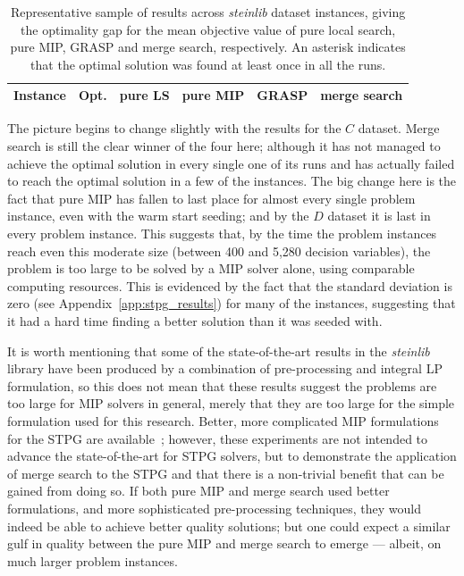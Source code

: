 \documentclass[preprint]{elsarticle}
\begin{document}
\begin{table}[h!]
\centering
\caption{Representative sample of results across \emph{steinlib} dataset instances, giving the optimality gap for the mean objective value of pure local search, pure MIP, GRASP and merge search, respectively. An asterisk indicates that the optimal solution was found at least once in all the runs.}\label{tab:stpg:results:trunc} 
\begin{tabular}{lrrrrr} \toprule
Instance & Opt. & pure LS & pure MIP & GRASP & merge search\\ \midrule
%

%
\bottomrule
\end{tabular}
\end{table}

The picture begins to change slightly with the results for the \(C\) dataset. Merge search is still the clear winner of the four here; although it has not managed to achieve the optimal solution in every single one of its runs and has actually failed to reach the optimal solution in a few of the instances. The big change here is the fact that pure MIP has fallen to last place for almost every single problem instance, even with the warm start seeding; and by the \(D\) dataset it is last in every problem instance. This suggests that, by the time the problem instances reach even this moderate size (between 400 and 5,280 decision variables), the problem is too large to be solved by a MIP solver alone, using comparable computing resources. This is evidenced by the fact that the standard deviation is zero (see Appendix~\ref{app:stpg_results}) for many of the instances, suggesting that it had a hard time finding a better solution than it was seeded with. 

It is worth mentioning that some of the state-of-the-art results in the \emph{steinlib} library have been produced by a combination of pre-processing and integral LP formulation, so this does not mean that these results suggest the problems are too large for MIP solvers in general, merely that they are too large for the simple formulation used for this research. Better, more complicated MIP formulations for the STPG are available~\citep{goemans,stpg-improved,hypergraph}; however, these experiments are not intended to advance the state-of-the-art for STPG solvers, but to demonstrate the application of merge search to the STPG and that there is a non-trivial benefit that can be gained from doing so. If both pure MIP and merge search used better formulations, and more sophisticated pre-processing techniques, they would indeed be able to achieve better quality solutions; but one could expect a similar gulf in quality between the pure MIP and merge search to emerge --- albeit, on much larger problem instances.
\end{document}
